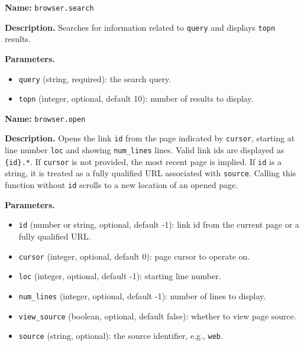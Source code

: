 \begin{custombox}[title=Tool Prompt: Search]
\label{box:tool-search}
\textbf{Name:} \texttt{browser.search}

\vspace{4pt}

\textbf{Description.}
Searches for information related to \texttt{query} and displays \texttt{topn} results.

\vspace{4pt}

\textbf{Parameters.}
\begin{itemize}[leftmargin=5pt, itemsep=0pt, parsep=0pt]
    \item \texttt{query} (string, required): the search query.
    \item \texttt{topn} (integer, optional, default 10): number of results to display.
\end{itemize}
\end{custombox}

\begin{custombox}[title=Tool Prompt: Open]
\label{box:tool-open}
\textbf{Name:} \texttt{browser.open}

\vspace{4pt}

\textbf{Description.}
Opens the link \texttt{id} from the page indicated by \texttt{cursor}, starting at line number \texttt{loc} and showing \texttt{num\_lines} lines. Valid link ids are displayed as \texttt{\cnli\{id\}\textdagger.*\cnri}. If \texttt{cursor} is not provided, the most recent page is implied. If \texttt{id} is a string, it is treated as a fully qualified URL associated with \texttt{source}. Calling this function without \texttt{id} scrolls to a new location of an opened page.

\vspace{4pt}

\textbf{Parameters.}
\begin{itemize}[leftmargin=5pt, itemsep=0pt, parsep=0pt]
\item \texttt{id} (number or string, optional, default -1): link id from the current page or a fully qualified URL.
\item \texttt{cursor} (integer, optional, default 0): page cursor to operate on.
\item \texttt{loc} (integer, optional, default -1): starting line number.
\item \texttt{num\_lines} (integer, optional, default -1): number of lines to display.
\item \texttt{view\_source} (boolean, optional, default false): whether to view page source.
\item \texttt{source} (string, optional): the source identifier, e.g., \texttt{web}.
\end{itemize}
\end{custombox}


